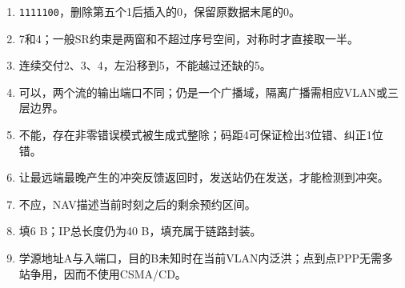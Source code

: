 \begin{enumerate}
\def\labelenumi{\arabic{enumi}.}
\tightlist
\item
  \texttt{1111100}，删除第五个1后插入的0，保留原数据末尾的0。
\item
  7和4；一般SR约束是两窗和不超过序号空间，对称时才直接取一半。
\item
  连续交付2、3、4，左沿移到5，不能越过还缺的5。
\item
  可以，两个流的输出端口不同；仍是一个广播域，隔离广播需相应VLAN或三层边界。
\item
  不能，存在非零错误模式被生成式整除；码距4可保证检出3位错、纠正1位错。
\item
  让最远端最晚产生的冲突反馈返回时，发送站仍在发送，才能检测到冲突。
\item
  不应，NAV描述当前时刻之后的剩余预约区间。
\item
  填6 B；IP总长度仍为40 B，填充属于链路封装。
\item
  学源地址A与入端口，目的B未知时在当前VLAN内泛洪；点到点PPP无需多站争用，因而不使用CSMA/CD。
\end{enumerate}

